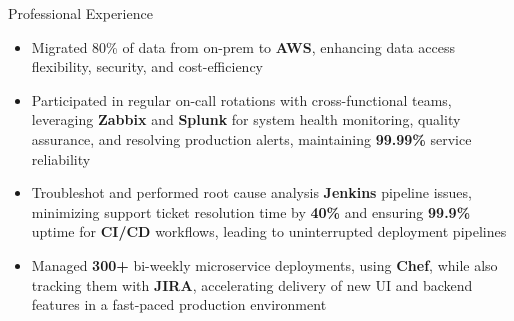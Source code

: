 \documentclass{resume}
\begin{document}
\begin{experienceSection}{Professional Experience}
    \experienceItem[
        company={Cerner Healthcare (Oracle Health)},
        location={Bangalore, India},
        position={System Engineer - 1},
        duration={May 2021 - Jul 2023}
    ]
    \begin{itemize}
        \itemsep -6pt {}
        \item Migrated 80\% of data from on-prem to \textbf{AWS}, enhancing data access flexibility, security, and cost-efficiency
        \item Participated in regular on-call rotations with cross-functional teams, leveraging \textbf{Zabbix} and \textbf{Splunk} for system health monitoring, quality assurance, and resolving production alerts, maintaining \textbf{99.99\%} service reliability
        \item Troubleshot and performed root cause analysis \textbf{Jenkins} pipeline issues, minimizing support ticket resolution time by \textbf{40\%} and ensuring \textbf{99.9\%} uptime for \textbf{CI/CD} workflows, leading to uninterrupted deployment pipelines
        \item Managed \textbf{300+} bi-weekly microservice deployments, using \textbf{Chef}, while also tracking them with \textbf{JIRA}, accelerating delivery of new UI and backend features in a fast-paced production environment
    \end{itemize}

\end{experienceSection}
\end{document}
